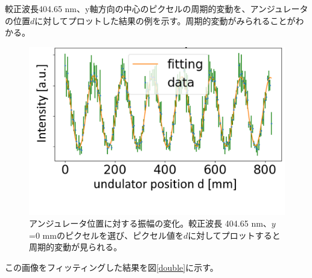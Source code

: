 \documentclass[a4paper,11pt,uplatex]{jsbook}
\begin{document}
較正波長404.65 nm、y軸方向の中心のピクセルの周期的変動を、アンジュレータの位置$d$に対してプロットした結果の例を示す。周期的変動がみられることがわかる。
\begin{figure}
  \centering
  \includegraphics[width=0.8\linewidth]{image/4-oscillation.png}
  \caption[アンジュレータ位置に対する振幅の変化]{アンジュレータ位置に対する振幅の変化。較正波長 404.65 nm、$y$ =0 mmのピクセルを選び、ピクセル値を$d$に対してプロットすると周期的変動が見られる。}
\end{figure}
この画像をフィッティングした結果を図\ref{double}に示す。
\end{document}
